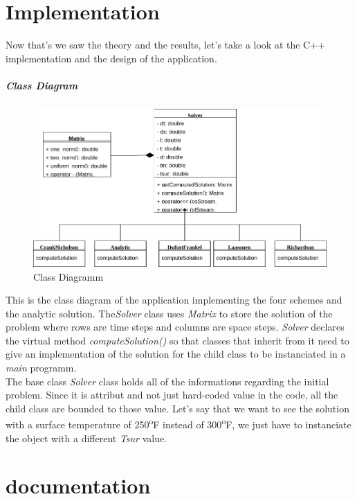 \documentclass[12pt, a4paper]{report}
\begin{document}
\chapter{Implementation}
Now that's we saw the theory and the results, let's take a look at the C++ implementation and the design of the application.
\paragraph{Class Diagram}
\begin{figure}[h]
\centering
\includegraphics[scale=0.5]{ClassDiagram.png}
\caption{Class Diagramm}
\end{figure}
\begin{appendix}
\clearpage
{}
This is the class diagram of the application implementing the four schemes and the analytic solution.  The\textit{Solver} class uses \textit{Matrix} to store the solution of the problem where rows are time steps and columns are space steps. \textit{Solver} declares the virtual method \textit{computeSolution()} so that classes that inherit from it need to give an implementation of the solution for the  child class to be instanciated in a \textit{main} programm.\\
The base class \textit{Solver} class holds all of the informations regarding the initial problem. Since it is attribut and not just hard-coded value in the code, all the child class are bounded to those value. Let's say that we want to see the solution with a surface temperature of 250\textsuperscript{o}F instead of 300\textsuperscript{o}F, we just have to instanciate the object with a different \textit{Tsur} value.

\chapter{documentation}


\end{appendix}
\end{document}
